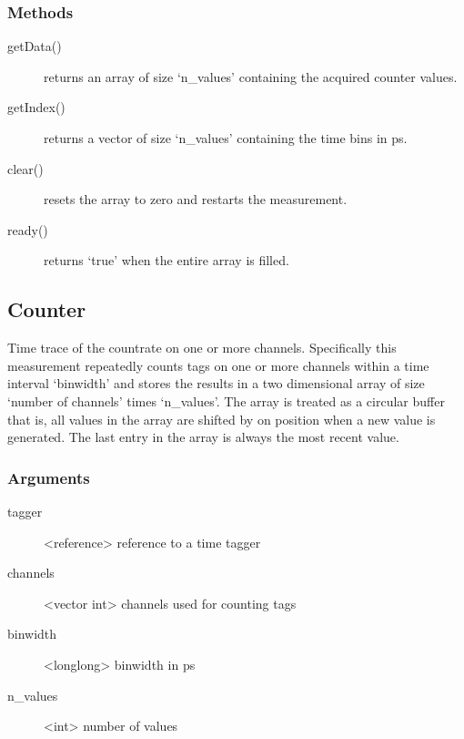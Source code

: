 \documentclass[letterpaper,10pt,english]{sphinxmanual}
\begin{document}
\subsubsection{Methods}
\label{sections/api:id3}\begin{description}
\item[{getData()}] \leavevmode
returns an array of size `n\_values' containing the acquired counter values.

\item[{getIndex()}] \leavevmode
returns a vector of size `n\_values' containing the time bins in ps.

\item[{clear()}] \leavevmode
resets the array to zero and restarts the measurement.

\item[{ready()}] \leavevmode
returns `true' when the entire array is filled.

\end{description}


\subsection{Counter}
\label{sections/api:counter}
Time trace of the countrate on one or more channels. Specifically
this measurement repeatedly counts tags on one or more channels within a
time interval `binwidth' and stores the results in a two dimensional array of size
`number of channels' times `n\_values'. The array is treated as a circular buffer that is,
all values in the array are shifted by on position when a new value is generated. The
last entry in the array is always the most recent value.


\subsubsection{Arguments}
\label{sections/api:id4}\begin{description}
\item[{tagger}] \leavevmode
\textless{}reference\textgreater{} reference to a time tagger

\item[{channels}] \leavevmode
\textless{}vector int\textgreater{} channels used for counting tags

\item[{binwidth}] \leavevmode
\textless{}longlong\textgreater{} binwidth in ps

\item[{n\_values}] \leavevmode
\textless{}int\textgreater{} number of values

\end{description}
\end{document}
